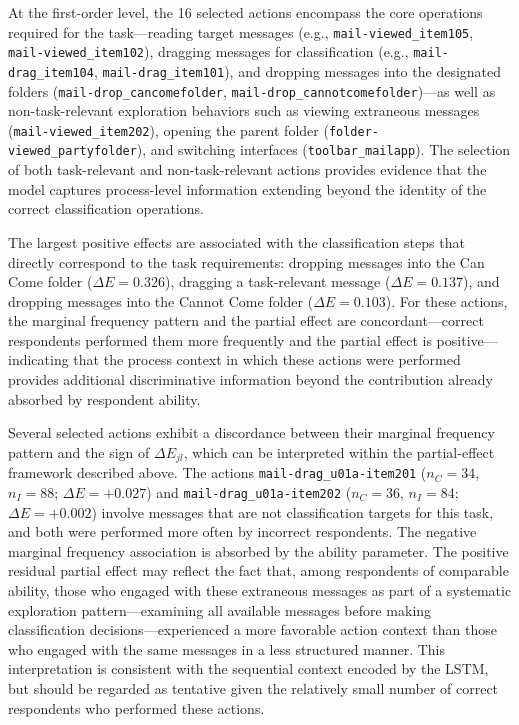 \documentclass[A4paper,11pt]{article}
\begin{document}
At the first-order level, the 16 selected actions encompass the core operations required for the task---reading target messages (e.g., \texttt{mail-viewed\_item105}, \texttt{mail-viewed\_item102}), dragging messages for classification (e.g., \texttt{mail-drag\_item104}, \texttt{mail-drag\_item101}), and dropping messages into the designated folders (\texttt{mail-drop\_cancomefolder}, \texttt{mail-drop\_cannotcomefolder})---as well as non-task-relevant exploration behaviors such as viewing extraneous messages (\texttt{mail-viewed\_item202}), opening the parent folder (\texttt{folder-viewed\_partyfolder}), and switching interfaces (\texttt{toolbar\_mailapp}). The selection of both task-relevant and non-task-relevant actions provides evidence that the model captures process-level information extending beyond the identity of the correct classification operations.

The largest positive effects are associated with the classification steps that directly correspond to the task requirements: dropping messages into the Can Come folder ($\Delta E = 0.326$), dragging a task-relevant message ($\Delta E = 0.137$), and dropping messages into the Cannot Come folder ($\Delta E = 0.103$). For these actions, the marginal frequency pattern and the partial effect are concordant---correct respondents performed them more frequently and the partial effect is positive---indicating that the process context in which these actions were performed provides additional discriminative information beyond the contribution already absorbed by respondent ability.

Several selected actions exhibit a discordance between their marginal frequency pattern and the sign of $\Delta E_{jl}$, which can be interpreted within the partial-effect framework described above. The actions \texttt{mail-drag\_u01a-item201} ($n_C = 34$, $n_I = 88$; $\Delta E = +0.027$) and \texttt{mail-drag\_u01a-item202} ($n_C = 36$, $n_I = 84$; $\Delta E = +0.002$) involve messages that are not classification targets for this task, and both were performed more often by incorrect respondents. The negative marginal frequency association is absorbed by the ability parameter. The positive residual partial effect may reflect the fact that, among respondents of comparable ability, those who engaged with these extraneous messages as part of a systematic exploration pattern---examining all available messages before making classification decisions---experienced a more favorable action context than those who engaged with the same messages in a less structured manner. This interpretation is consistent with the sequential context encoded by the LSTM, but should be regarded as tentative given the relatively small number of correct respondents who performed these actions.
\end{document}
